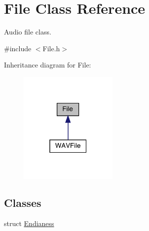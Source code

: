 \hypertarget{class_file}{}\section{File Class Reference}
\label{class_file}


Audio file class.  




{\ttfamily \#include $<$File.\+h$>$}



Inheritance diagram for File\+:
\nopagebreak
\begin{figure}[H]
\begin{center}
\leavevmode
\includegraphics[width=135pt]{class_file__inherit__graph}
\end{center}
\end{figure}
\subsection*{Classes}
\begin{DoxyCompactItemize}
\item 
struct \hyperlink{struct_file_1_1_endianess}{Endianess}
\end{DoxyCompactItemize}
